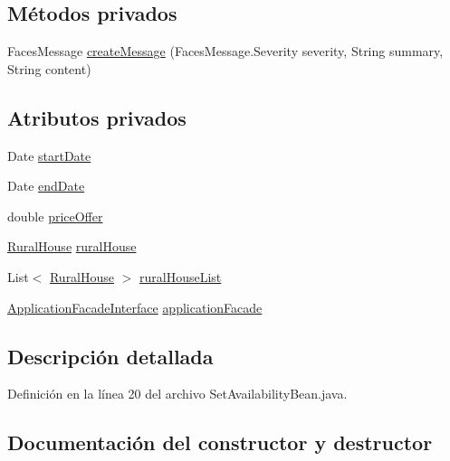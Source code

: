\subsection*{Métodos privados}
\begin{DoxyCompactItemize}
\item 
Faces\+Message \mbox{\hyperlink{a00228_a827001537a7a94df4b1949dc97d9fcf3}{create\+Message}} (Faces\+Message.\+Severity severity, String summary, String content)
\end{DoxyCompactItemize}
\subsection*{Atributos privados}
\begin{DoxyCompactItemize}
\item 
Date \mbox{\hyperlink{a00228_a6962c301508cdd26f40a28468d59009c}{start\+Date}}
\item 
Date \mbox{\hyperlink{a00228_a1620f454f1d1fe18418037a9490744cd}{end\+Date}}
\item 
double \mbox{\hyperlink{a00228_a3887b9317413abac9db351e53198f03b}{price\+Offer}}
\item 
\mbox{\hyperlink{a00188}{Rural\+House}} \mbox{\hyperlink{a00228_a38f4f2cc1f2c0647c1dea95c3e9c2fea}{rural\+House}}
\item 
List$<$ \mbox{\hyperlink{a00188}{Rural\+House}} $>$ \mbox{\hyperlink{a00228_a5505b4ba943e6db5ce5a8b23693b6349}{rural\+House\+List}}
\item 
\mbox{\hyperlink{a00136}{Application\+Facade\+Interface}} \mbox{\hyperlink{a00228_a1761e4ea575572afa2a495de5eadbd7b}{application\+Facade}}
\end{DoxyCompactItemize}


\subsection{Descripción detallada}


Definición en la línea 20 del archivo Set\+Availability\+Bean.\+java.



\subsection{Documentación del constructor y destructor}
\mbox{\label{a00228_a5eb9c427878e584a4850a8f48fcdbdb7}} 
